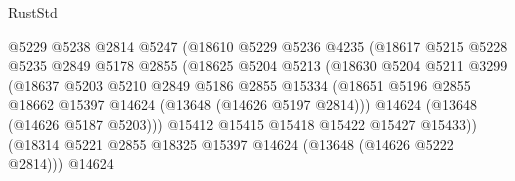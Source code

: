 \begin{lexlean}{RustStd}
\begin{coremodule}
                                    @5229
                                    @5238
                                    @2814
                                    @5247
                                    (@18610
                                      @5229
                                      @5236
                                      @4235
                                      (@18617
                                        @5215
                                        @5228
                                        @5235
                                        @2849
                                        @5178
                                        @2855
                                        (@18625
                                          @5204
                                          @5213
                                          (@18630
                                            @5204
                                            @5211
                                            @3299
                                            (@18637
                                              @5203
                                              @5210
                                              @2849
                                              @5186
                                              @2855
                                              @15334
                                              (@18651
                                                @5196
                                                @2855
                                                @18662
                                                @15397
                                                @14624
                                                (@13648 (@14626 @5197 @2814)))
                                              @14624
                                              (@13648 (@14626 @5187 @5203)))
                                            @15412
                                            @15415
                                            @15418
                                            @15422
                                            @15427
                                            @15433))
                                        (@18314
                                          @5221
                                          @2855
                                          @18325
                                          @15397
                                          @14624
                                          (@13648 (@14626 @5222 @2814)))
                                        @14624

\end{coremodule}
\end{lexlean}
